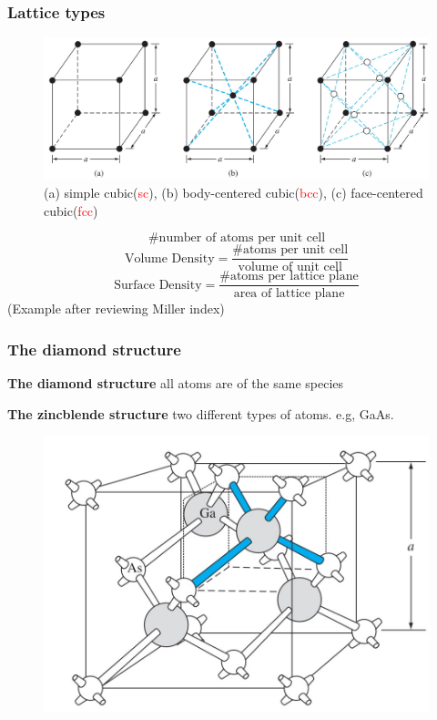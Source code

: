 \documentclass{beamer}
\begin{document}
    \begin{frame} \frametitle{Lattice types}
        \begin{figure}[H]
            \centering
            \includegraphics[width=0.9\linewidth]{Lattice_types.jpg}
            \caption{\tiny (a) simple cubic(\textcolor{red}{sc}), (b) body-centered cubic(\textcolor{red}{bcc}), (c) face-centered cubic(\textcolor{red}{fcc})}
            \label{fig:Lattice_types.jpg}
        \end{figure}
        \begin{equation*}
            \# \text{number of atoms per unit cell}
        \end{equation*}
        \begin{equation*}
            \text{Volume Density} = \frac{\text{\# atoms per unit cell}}{\text{volume of unit cell}} 
        \end{equation*}
        \begin{equation*}
            \text{Surface Density} = \frac{\text{\# atoms per lattice plane}}{\text{area of lattice plane}}
        \end{equation*}
        (Example after reviewing Miller index)
    \end{frame}


    \begin{frame} \frametitle{The diamond structure}
        \par \textbf{The diamond structure } all atoms are of the same species
        \par \textbf{The zincblende structure } two different types of atoms. e.g, GaAs.
        \begin{figure}[H]
            \centering
            \includegraphics[width=0.5\linewidth]{GaAs_zincblende.jpg}
            \label{fig:GaAs_zincblende.jpg}
        \end{figure}
    \end{frame}
\end{document}
